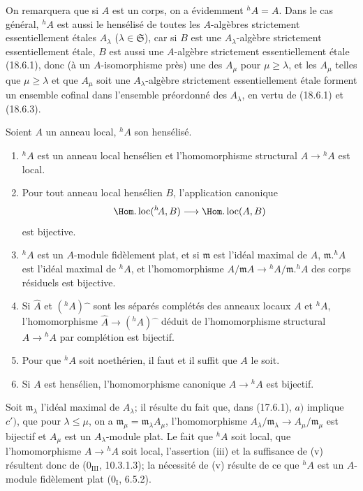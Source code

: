 On remarquera que si $A$ est un corps, on a évidemment ${}^h\!A=A$. Dans le cas général, ${}^h\!A$ est aussi le hensélisé de toutes les $A$-algèbres strictement essentiellement étales $A_\lambda$ ($\lambda\in\mathfrak S$), car si $B$ est une $A_\lambda$-algèbre strictement essentiellement étale, $B$ est aussi une $A$-algèbre strictement essentiellement étale (18.6.1), donc (à un $A$-isomorphisme près) une des $A_\mu$ pour $\mu\geq\lambda$, et les $A_\mu$ telles que $\mu\geq\lambda$ et que $A_\mu$ soit une $A_\lambda$-algèbre strictement essentiellement étale forment un ensemble cofinal dans l'ensemble préordonné des $A_\lambda$, en vertu de (18.6.1) et (18.6.3).

\begin{theorem}[18.6.6]
\label{IV.18.6.6}
Soient $A$ un anneau local, ${}^h\!A$ son hensélisé.
\begin{enumerate}
  \item[(i)] ${}^h\!A$ est un anneau local hensélien et l'homomorphisme structural $A\to{}^h\!A$ est local.
  \item[(ii)] Pour tout anneau local hensélien $B$, l'application canonique
  \[
    \Hom.\operatorname{loc}({}^h\!A,B)\longrightarrow\Hom.\operatorname{loc}(A,B)
  \]
  est bijective.
  \item[(iii)] ${}^h\!A$ est un $A$-module fidèlement plat, et si $\mathfrak m$ est l'idéal maximal de $A$, $\mathfrak m.{}^h\!A$ est l'idéal maximal de ${}^h\!A$, et l'homomorphisme $A/\mathfrak mA\to{}^h\!A/\mathfrak m.{}^h\!A$ des corps résiduels est bijective.
  \item[(iv)] Si $\widehat A$ et $({}^h\!A)\widehat{\phantom{x}}$ sont les séparés complétés des anneaux locaux $A$ et ${}^h\!A$, l'homomorphisme $\widehat A\to({}^h\!A)\widehat{\phantom{x}}$ déduit de l'homomorphisme structural $A\to{}^h\!A$ par complétion est bijectif.
  \item[(v)] Pour que ${}^h\!A$ soit noethérien, il faut et il suffit que $A$ le soit.
  \item[(vi)] Si $A$ est hensélien, l'homomorphisme canonique $A\to{}^h\!A$ est bijectif.
\end{enumerate}
\end{theorem}


Soit $\mathfrak m_\lambda$ l'idéal maximal de $A_\lambda$; il résulte du fait que, dans (17.6.1), $a)$ implique $c')$, que pour $\lambda\leq\mu$, on a $\mathfrak m_\mu=\mathfrak m_\lambda A_\mu$, l'homomorphisme $A_\lambda/\mathfrak m_\lambda\to A_\mu/\mathfrak m_\mu$ est bijectif et $A_\mu$ est un $A_\lambda$-module plat. Le fait que ${}^h\!A$ soit local, que l'homomorphisme $A\to{}^h\!A$ soit local, l'assertion (iii) et la suffisance de (v) résultent donc de ($0_{\mathrm{III}}$, 10.3.1.3); la nécessité de (v) résulte de ce que ${}^h\!A$ est un $A$-module fidèlement plat ($0_{\mathrm I}$, 6.5.2).

